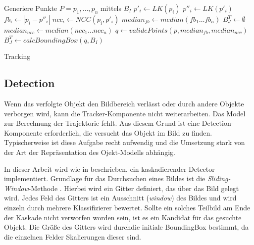 	\begin{algorithm}[H]
	\vspace{0.2cm}
	Generiere Punkte $P = p_{1},\ldots,p_{n}$ mittels $B_{I}$\;
	 {
		$p'_{i} \leftarrow LK(p_{i})$\;
		$p''_{i} \leftarrow LK(p'_{i})$\;
		$fb_{i} \leftarrow |p_{i}-p''_{i}|$\;
		$ncc_{i} \leftarrow NCC(p_{i},p'_{i})$\;
	}
	$median_{fb}\leftarrow median(fb_{1}\ldots fb_{n})$\;
	 {
		$B_{J}^T \leftarrow \emptyset$\;
	} {
		$median_{ncc} \leftarrow median(ncc_{1}\dots ncc_{n})$\;
		$q \leftarrow validePoints(p,median_{fb},median_{ncc})$\;
		$B_{J}^T \leftarrow calcBoundingBox(q,B_{I})$\;
	}
	\caption{Tracking}
	\label{alg:tracking}
	\vspace{0.2cm}
	\end{algorithm}

	\subsection{Detection}
	\label{subsection:detection}
	Wenn das verfolgte Objekt den Bildbereich verlässt oder durch andere Objekte verborgen wird, kann die Tracker-Komponente nicht weiterarbeiten. Das Model zur Berechnung der Trajektorie fehlt. Aus diesem Grund ist eine Detection-Komponente erforderlich, die versucht das Objekt im Bild zu finden. Typischerweise ist diese Aufgabe recht aufwendig und die Umsetzung stark von der Art der Repräsentation des Ojekt-Modells abhängig.

	In dieser Arbeit wird wie in \cite{TLD} beschrieben, ein kaskadierender Detector implementiert. Grundlage für das Durchsuchen eines Bildes ist die \textit{Sliding-Window}-Methode \cite{key-6}. Hierbei wird ein Gitter definiert, das über das Bild gelegt wird. Jedes Feld des Gitters ist ein Ausschnitt (\textit{window}) des Bildes und wird einzeln durch mehrere Klassifizierer bewertet. Sollte ein solches Teilbild am Ende der Kaskade nicht verworfen worden sein, ist es ein Kandidat für das gesuchte Objekt. Die Größe des Gitters wird durchdie initiale BoundingBox bestimmt, da die einzelnen Felder Skalierungen dieser sind.

